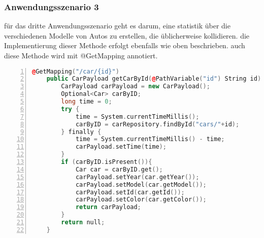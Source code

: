 \subsubsection{Anwendungsszenario 3}

für das dritte Anwendungsszenario geht es darum, eine statistik über die verschiedenen Modelle von Autos zu erstellen, die üblicherweise kollidieren. die Implementierung dieser Methode erfolgt ebenfalls wie oben beschrieben. auch diese Methode wird mit @GetMapping annotiert.\\
\begin{lstlisting}[numbers=left,language=c++, caption={Suche im Graph}]
    @GetMapping("/car/{id}")
    public CarPayload getCarById(@PathVariable("id") String id){
        CarPayload carPayload = new CarPayload();
        Optional<Car> carByID;
        long time = 0;
        try {
            time = System.currentTimeMillis();
            carByID = carRepository.findById("cars/"+id);
        } finally {
            time = System.currentTimeMillis() - time;
            carPayload.setTime(time);
        }
        if (carByID.isPresent()){
            Car car = carByID.get();
            carPayload.setYear(car.getYear());
            carPayload.setModel(car.getModel());
            carPayload.setId(car.getId());
            carPayload.setColor(car.getColor());
            return carPayload;
        }
        return null;
    }
\end{lstlisting}